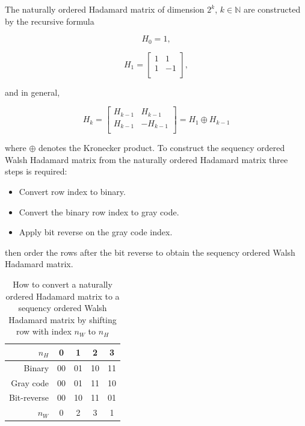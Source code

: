 The naturally ordered Hadamard matrix of dimension $2^k$, $k \in \mathbb{N}$ are constructed by the recursive formula    

\begin{equation}
    H_0 = 1,
\end{equation}

\begin{equation}
    H_1 = \begin{bmatrix}
       1 & 1 \\
       1 & -1\\
     \end{bmatrix},
\end{equation}

and in general,

\begin{equation}
        H_k = \begin{bmatrix}
       H_{k-1} & H_{k-1} \\
       H_{k-1} & -H_{k-1}\\
       \end{bmatrix} = H_1 \oplus H_{k-1}
\end{equation}

where $\oplus$ denotes the Kronecker product. To construct the sequency ordered Walsh Hadamard matrix from the naturally ordered Hadamard matrix three steps is required:

\begin{itemize}
    \item Convert row index to binary.
    \item Convert the binary row index to gray code.
    \item Apply bit reverse on the gray code index.
\end{itemize}

then order the rows after the bit reverse to obtain the sequency ordered Walsh Hadamard matrix.

\begin{table}[H]
\begin{tabular}{|r|c|c|c|c|}
\hline
    $n_H$        & 0    & 1     & 2     & 3     \\ \hline
    Binary       & 00   & 01    & 10    & 11    \\ \hline
    Gray code    & 00   & 01    & 11    & 10    \\ \hline
    Bit-reverse  & 00   & 10    & 11    & 01    \\ \hline
    $n_W$        & 0    & 2     & 3     & 1     \\ \hline
    
\end{tabular}
\label{tab:Hadamard_2_Walsh}
\caption{How to convert a naturally ordered Hadamard matrix to a sequency ordered Walsh Hadamard matrix by shifting row with index $n_W$ to $n_H$}
\end{table}

